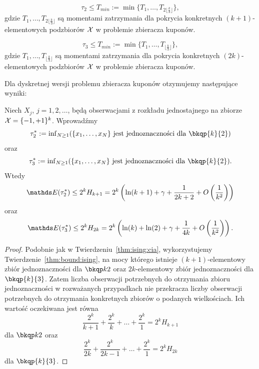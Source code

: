 \begin{corollary}
\leavevmode
\makeatletter
\@nobreaktrue
\makeatother
$$
\tau_2 \leq T_{min}:=\min\{T_1,\ldots,T_{2\lfloor\frac{k}{3}\rfloor}\},
$$
gdzie $T_1,\ldots,T_{2\lfloor\frac{k}{3}\rfloor}$ są momentami zatrzymania dla pokrycia konkretnych $(k+1)$-elementowych podzbiorów $\mathcal{X}$ w problemie zbieracza kuponów.
\end{corollary}

\begin{corollary}
\leavevmode
\makeatletter
\@nobreaktrue
\makeatother
$$
\tau_3 \leq T_{min}:=\min\{T_1,\ldots,T_{\lfloor\frac{k}{3}\rfloor}\},
$$
gdzie $T_1,\ldots,T_{\lfloor\frac{k}{3}\rfloor}$ są momentami zatrzymania dla pokrycia konkretnych $(2k)$-elementowych podzbiorów $\mathcal{X}$ w problemie zbieracza kuponów.
\end{corollary}


\noindent
Dla dyskretnej wersji problemu zbieracza kuponów otzymujemy następujące wyniki:

\noindent
\begin{theorem}\label{thm:ising:cia}
Niech $X_j$, $j=1,2,\ldots$, będą obserwacjami z rozkładu jednostajnego na zbiorze $\mathcal{X}=\{-1,+1\}^k$. Wprowadźmy 
$$
\tau^*_2:={\rm{inf}}_{N\geq 1}(\{x_1,\ldots,x_N\}\ {\rm{jest\ jednoznaczno{\textrm{\'s}}ci\ dla\ }} \bkqp{k}{2})
$$    
oraz
$$
\tau^*_3:={\rm{inf}}_{N\geq 1}(\{x_1,\ldots,x_N\}\ {\rm{jest\ jednoznaczno{\textrm{\'s}}ci\ dla\ }} \bkqp{k}{2}).
$$ 
Wtedy
$$
\EE(\tau^*_2) \leq 2^k{H_{k+1}} = 2^k \left(\ln(k+1)+\gamma+\frac{1}{2k+2}+O\left(\frac{1}{k^2}\right)\right)
$$
oraz
$$
\EE(\tau^*_3) \leq 2^k{H_{2k}} = 2^k \left(\ln(k)+\ln(2)+\gamma+\frac{1}{4k}+O\left(\frac{1}{k^2}\right)\right).
$$
\end{theorem}
\begin{proof}
Podobnie jak w Twierdzeniu~\ref{thm:ising:cia}, wykorzystujemy Twierdzenie~\ref{thm:bound:ising}, na mocy którego istnieje $(k+1)$-elementowy zbiór jednoznaczności dla $\ising$ oraz $2k$-elementowy zbiór jednoznaczności dla $\bkqp{k}{3}$. Zatem liczba obserwacji potrzebnych do otrzymania zbioru jednoznaczności w rozważanych przypadkach nie przekracza liczby obserwacji potrzebnych do otrzymania konkretnych zbiorów o podanych wielkościach. Ich wartość oczekiwana jest równa
$$
\frac{2^k}{k+1} + \frac{2^k}{k} + \ldots + \frac{2^k}{1} = 2^k H_{k+1}
$$
dla $\ising$ oraz
$$
\frac{2^k}{2k} + \frac{2^k}{2k-1} + \ldots + \frac{2^k}{1} = 2^k H_{2k}
$$
dla $\bkqp{k}{3}$.
\end{proof}

